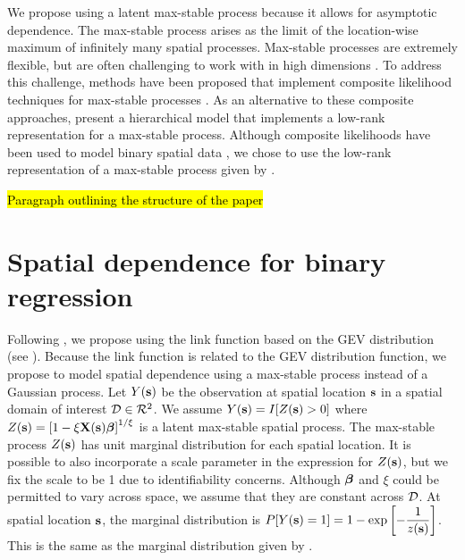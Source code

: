 \documentclass[11pt]{article}
\begin{document}
We propose using a latent max-stable process \citep{deHaan1984} because it allows for asymptotic dependence.
The max-stable process arises as the limit of the location-wise maximum of infinitely many spatial processes.
Max-stable processes are extremely flexible, but are often challenging to work with in high dimensions \citep{Wadsworth2014,Thibaud2013a}.
To address this challenge, methods have been proposed that implement composite likelihood techniques for max-stable processes \citep{Padoan2010,Genton2011,Huser2014}.
As an alternative to these composite approaches, \citet{Reich2012} present a hierarchical model that implements a low-rank representation for a max-stable process.
Although composite likelihoods have been used to model binary spatial data \citep{Heagerty1998}, we chose to use the low-rank representation of a max-stable process given by \citet{Reich2012}.

\hl{Paragraph outlining the structure of the paper}

\section{Spatial dependence for binary regression} \label{rbs:spatdep}
Following \citet{Wang2010}, we propose using the link function based on the GEV distribution (see ).
Because the link function is related to the GEV distribution function, we propose to model spatial dependence using a max-stable process \citep{deHaan1984} instead of a Gaussian process.
Let $Y(\mbox{\bf s})$ be the observation at spatial location $\mbox{\bf s}$ in a spatial domain of interest ${\cal D} \in {\cal R}^2$.
We assume $Y(\mbox{\bf s}) = I[Z(\mbox{\bf s}) > 0]$ where $Z(\mbox{\bf s}) = \left[1 - \xi \mbox{\bf X}(\mbox{\bf s}) \mbox{\boldmath $\beta$} \right]^{1 / \xi}$ is a latent max-stable spatial process.
The max-stable process $Z(\mbox{\bf s})$ has unit \Frechet marginal distribution for each spatial location.
It is possible to also incorporate a scale parameter in the expression for $Z(\mbox{\bf s})$, but we fix the scale to be 1 due to identifiability concerns.
Although $\mbox{\boldmath $\beta$}$ and $\xi$ could be permitted to vary across space, we assume that they are constant across ${\cal D}$.
At spatial location $\mbox{\bf s}$, the marginal distribution is \mbox{$P[Y(\mbox{\bf s}) = 1] = 1 - \exp\left[ -\displaystyle\frac{ 1 }{ z(\mbox{\bf s})} \right]$}.
This is the same as the marginal distribution given by \citet{Wang2010}.
\end{document}
